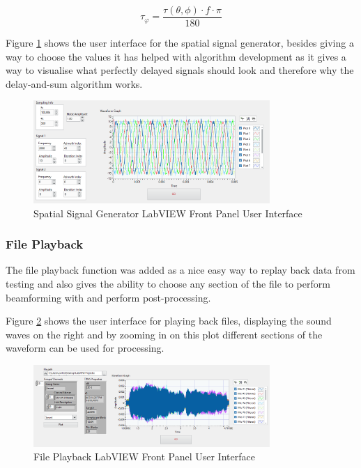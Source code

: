 \documentclass{UoNMCHA}
\numberwithin{equation}{section}
\begin{document}
    \begin{equation}
        \tau_{\varphi} = \frac{\tau(\theta,\phi) \cdot f \cdot \pi}{180}
        \label{eq:phase delay}
    \end{equation}
    
    Figure \ref{fig:SignalGenPanel} shows the user interface for the spatial signal generator, besides giving a way to choose the values it has helped with algorithm development as it gives a way to visualise what perfectly delayed signals should look and therefore why the delay-and-sum algorithm works.
    
    \begin{figure}[H]
        \centering
        \includegraphics[keepaspectratio, width = 0.8\textwidth]{Figures/SignalGenPanel_5ULA50mm.png}
        \caption{Spatial Signal Generator LabVIEW Front Panel User Interface}
        \label{fig:SignalGenPanel}
    \end{figure}    

\subsubsection{File Playback} \label{sec:File Playback}

The file playback function was added as a nice easy way to replay back data from testing and also gives the ability to choose any section of the file to perform beamforming with and perform post-processing.

Figure \ref{fig:FilePlaybackPanel} shows the user interface for playing back files, displaying the sound waves on the right and by zooming in on this plot different sections of the waveform can be used for processing.

    \begin{figure}[H]
        \centering
        \includegraphics[keepaspectratio, width = 0.8\textwidth]{Figures/FilePlaybackPanel.png}
        \caption{File Playback LabVIEW Front Panel User Interface}
        \label{fig:FilePlaybackPanel}
    \end{figure}  
\end{document}
